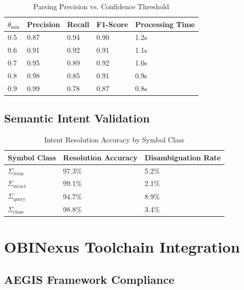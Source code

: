 \documentclass[11pt,a4paper]{article}
\theoremstyle{definition}
\theoremstyle{remark}
\begin{document}
\begin{table}[h]
\centering
\caption{Parsing Precision vs. Confidence Threshold}
\label{tab:precision-analysis}
\begin{tabular}{@{}lllll@{}}
\toprule
$\theta_{\min}$ & Precision & Recall & F1-Score & Processing Time \\
\midrule
0.5 & 0.87 & 0.94 & 0.90 & 1.2s \\
0.6 & 0.91 & 0.92 & 0.91 & 1.1s \\
0.7 & 0.95 & 0.89 & 0.92 & 1.0s \\
0.8 & 0.98 & 0.85 & 0.91 & 0.9s \\
0.9 & 0.99 & 0.78 & 0.87 & 0.8s \\
\bottomrule
\end{tabular}
\end{table}

\subsection{Semantic Intent Validation}
\label{subsec:intent-validation}

\begin{table}[h]
\centering  
\caption{Intent Resolution Accuracy by Symbol Class}
\label{tab:intent-accuracy}
\begin{tabular}{@{}lll@{}}
\toprule
Symbol Class & Resolution Accuracy & Disambiguation Rate \\
\midrule
$\Sigma_{\text{term}}$ & 97.3\% & 5.2\% \\
$\Sigma_{\text{struct}}$ & 99.1\% & 2.1\% \\
$\Sigma_{\text{query}}$ & 94.7\% & 8.9\% \\
$\Sigma_{\text{close}}$ & 98.8\% & 3.4\% \\
\bottomrule
\end{tabular}
\end{table}


\section{OBINexus Toolchain Integration}
\label{sec:obinexus-integration}

\subsection{AEGIS Framework Compliance}
\label{subsec:aegis-compliance}
\end{document}
